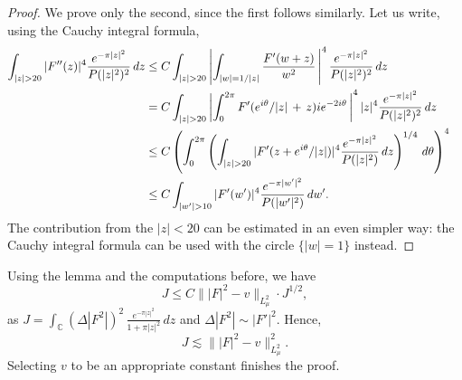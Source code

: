 \documentclass[a4paper,11pt,reqno]{amsart}
\numberwithin{equation}{section}
\theoremstyle{plain} %
\theoremstyle{definition} %
\theoremstyle{remark}
\newcommand{\C}{\mathbb{C}}
\begin{document}
\begin{proof} We prove only the second, since the first follows similarly. Let us write, using the Cauchy integral formula, 
\begin{align*}
\int_{|z|>20} |F''(z)|^4 \frac{e^{-\pi|z|^2}}{P(|z|^2)^2} \, dz & \le C \int_{|z| > 20} \left| \int_{|w| = 1/|z|} \frac{F'(w+z)}{w^2} \, \right|^4   \frac{e^{-\pi|z|^2}}{P(|z|^2)^2} \, dz \cr 
 & = C \int_{|z|> 20}  \left| \int_{0}^{2\pi} F'(e^{i\theta}/|z| \,+\,z) ie^{-2i\theta} \, \right|^4  |z|^4 \frac{e^{-\pi|z|^2}}{P(|z|^2)^2} \, dz \cr 
 & \le C \left( \int_0^{2\pi} \left( \int_{|z|>20} |F'(z + e^{i\theta}/|z|)|^4 \frac{e^{-\pi|z|^2}}{P(|z|^2)} \, dz \right)^{1/4} \, d\theta \right)^4 \cr 
 & \le C \int_{|w'|>10} |F'(w')|^4 \frac{e^{-\pi |w'|^2}}{P(|w'|^2)} \, dw'. 
\end{align*}
The contribution from the $|z|<20$ can be estimated in an even simpler way: the Cauchy integral formula can be used with the circle $\{|w| =1\}$ instead. 
\end{proof} 

Using the lemma and the computations before, we have 
\[
J \le C  \||F|^2 - v\|_{L^2_\mu}\cdot J^{1/2},
\]
as $J = \int_{\C} (\Delta|F^2|)^2 \, \frac{e^{-\pi|z|^2}}{1+\pi |z|^2} \, dz $ and $\Delta |F^2| \sim |F'|^2$. Hence, 
\[
J \lesssim \| |F|^2 - v\|_{L^2_\mu}^2.
\]
Selecting $v$ to be an appropriate constant finishes the proof. 
\end{document}
